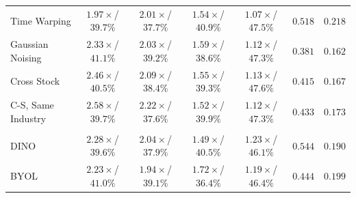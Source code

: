 \begin{table}[tp]
{\begin{tabular}{lcccccc}
Time Warping & $1.97{\scriptstyle\times}$/\textcolor{green!45!black}{$\mathbf{39.7{\scriptstyle\%}}$} & $2.01{\scriptstyle\times}$/\textcolor{green!45!black}{$\mathbf{37.7{\scriptstyle\%}}$} & \textcolor{red!75!black}{$1.54{\scriptstyle\times}$}/\textcolor{red!75!black}{$40.9{\scriptstyle\%}$} & \textcolor{red!75!black}{$1.07{\scriptstyle\times}$}/\textcolor{red!75!black}{$47.5{\scriptstyle\%}$} & $0.518$ & $0.218$ \\
Gaussian Noising & $2.33{\scriptstyle\times}$/$41.1{\scriptstyle\%}$ & $2.03{\scriptstyle\times}$/$39.2{\scriptstyle\%}$ & \textcolor{red!75!black}{$1.59{\scriptstyle\times}$}/\textcolor{red!75!black}{$38.6{\scriptstyle\%}$} & \textcolor{red!75!black}{$1.12{\scriptstyle\times}$}/\textcolor{red!75!black}{$47.3{\scriptstyle\%}$} & \textcolor{red!75!black}{$0.381$} & $0.162$ \\
Cross Stock & $2.46{\scriptstyle\times}$/$40.5{\scriptstyle\%}$ & $2.09{\scriptstyle\times}$/$38.4{\scriptstyle\%}$ & \textcolor{red!75!black}{$1.55{\scriptstyle\times}$}/\textcolor{red!75!black}{$39.3{\scriptstyle\%}$} & \textcolor{red!75!black}{$1.13{\scriptstyle\times}$}/\textcolor{red!75!black}{$47.6{\scriptstyle\%}$} & \textcolor{red!75!black}{$0.415$} & $0.167$ \\
C-S, Same Industry & \textcolor{green!45!black}{$\mathbf{2.58{\scriptstyle\times}}$}/$39.7{\scriptstyle\%}$ & \textcolor{green!45!black}{$\mathbf{2.22{\scriptstyle\times}}$}/\textcolor{green!45!black}{$\mathbf{37.6{\scriptstyle\%}}$} & \textcolor{red!75!black}{$1.52{\scriptstyle\times}$}/\textcolor{red!75!black}{$39.9{\scriptstyle\%}$} & \textcolor{red!75!black}{$1.12{\scriptstyle\times}$}/\textcolor{red!75!black}{$47.3{\scriptstyle\%}$} & \textcolor{red!75!black}{$0.433$} & $0.173$ \\
\addlinespace \multicolumn{7}{l}{\emph{SSL}} \\
DINO~\citep{caron_etal_dino} & $2.28{\scriptstyle\times}$/\textcolor{green!45!black}{$\mathbf{39.6{\scriptstyle\%}}$} & $2.04{\scriptstyle\times}$/$37.9{\scriptstyle\%}$ & \textcolor{red!75!black}{$1.49{\scriptstyle\times}$}/\textcolor{red!75!black}{$40.5{\scriptstyle\%}$} & $1.23{\scriptstyle\times}$/$46.1{\scriptstyle\%}$ & $0.544$ & $0.190$ \\
BYOL~\citep{grill2020bootstraplatentnewapproach} & $2.23{\scriptstyle\times}$/$41.0{\scriptstyle\%}$ & $1.94{\scriptstyle\times}$/$39.1{\scriptstyle\%}$ & \textcolor{red!75!black}{$1.72{\scriptstyle\times}$}/\textcolor{red!75!black}{$36.4{\scriptstyle\%}$} & $1.19{\scriptstyle\times}$/$46.4{\scriptstyle\%}$ & \textcolor{red!75!black}{$0.444$} & $0.199$ \\

\end{tabular}}
\end{table}
